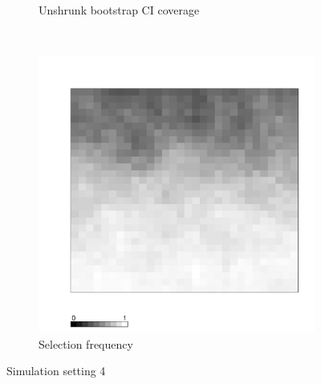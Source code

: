 \documentclass[authoryear, review, 11pt]{elsarticle}
\begin{document}
\begin{figure}
\begin{subfigure}[b]{0.45\textwidth}
		\caption{Unshrunk bootstrap CI coverage}
	\end{subfigure}%
	~ %
	\begin{subfigure}[b]{0.45\textwidth}
	\centering
		\includegraphics[width=\textwidth]{../../figures/simulation/X1.15.4.selection.pdf}
		\caption{Selection frequency}
	\end{subfigure}
	\caption{Simulation setting 4}
\end{figure}

\clearpage
\end{document}
